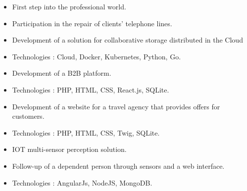 
\begin{itemize}
\item First step into the professional world.
\item Participation in the repair of clients' telephone lines.
\end{itemize}

\begin{itemize}
\item Development of a solution for collaborative storage distributed in the Cloud
\item Technologies : Cloud, Docker, Kubernetes, Python, Go.
\end{itemize}

\divider

\begin{itemize}
\item Development of a B2B platform.
\item Technologies : PHP, HTML, CSS, React.js, SQLite.
\end{itemize}

\divider

\begin{itemize}
\item Development of a website for a travel agency that provides offers for customers.
\item Technologies : PHP, HTML, CSS, Twig, SQLite.
\end{itemize}

\divider

\begin{itemize}
\item IOT multi-sensor perception solution.
\item Follow-up of a dependent person through sensors and a web interface.
\item Technologies : AngularJs, NodeJS, MongoDB.
\end{itemize}



